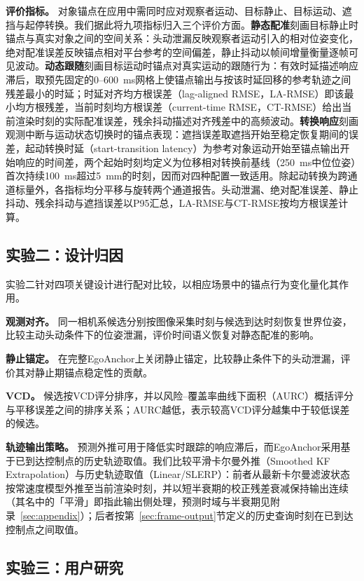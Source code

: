 \documentclass[review]{vgtc}
\begin{document}
\textbf{评价指标。}
对象锚点在应用中需同时应对观察者运动、目标静止、目标运动、遮挡与起停转换。我们据此将九项指标归入三个评价方面。\textbf{静态配准}刻画目标静止时锚点与真实对象之间的空间关系：头动泄漏反映观察者运动引入的相对位姿变化，绝对配准误差反映锚点相对平台参考的空间偏差，静止抖动以帧间增量衡量逐帧可见波动。\textbf{动态跟随}刻画目标运动时锚点对真实运动的跟随行为：有效时延描述响应滞后，取预先固定的0--600~ms网格上使锚点输出与按该时延回移的参考轨迹之间残差最小的时延；时延对齐均方根误差（lag-aligned RMSE，LA-RMSE）即该最小均方根残差，当前时刻均方根误差（current-time RMSE，CT-RMSE）给出当前渲染时刻的实际配准误差，残余抖动描述对齐残差中的高频波动。\textbf{转换响应}刻画观测中断与运动状态切换时的锚点表现：遮挡误差取遮挡开始至稳定恢复期间的误差，起动转换时延（start-transition latency）为参考对象运动开始至锚点输出开始响应的时间差，两个起始时刻均定义为位移相对转换前基线（250~ms中位位姿）首次持续100~ms超过5~mm的时刻，因而对四种配置一致适用。除起动转换为跨通道标量外，各指标均分平移与旋转两个通道报告。头动泄漏、绝对配准误差、静止抖动、残余抖动与遮挡误差以P95汇总，LA-RMSE与CT-RMSE按均方根误差计算。

\subsection{实验二：设计归因}\label{sec:exp2-design}

实验二针对四项关键设计进行配对比较，以相应场景中的锚点行为变化量化其作用。

\textbf{观测对齐。}
同一相机系候选分别按图像采集时刻与候选到达时刻恢复世界位姿，比较主动头动条件下的位姿泄漏，评价时间语义恢复对静态配准的影响。

\textbf{静止锚定。}
在完整EgoAnchor上关闭静止锚定，比较静止条件下的头动泄漏，评价其对静止期锚点稳定性的贡献。

\textbf{VCD。}
候选按VCD评分排序，并以风险--覆盖率曲线下面积（AURC）概括评分与平移误差之间的排序关系；AURC越低，表示较高VCD评分越集中于较低误差的候选。

\textbf{轨迹输出策略。}
预测外推可用于降低实时跟踪的响应滞后，而EgoAnchor采用基于已到达控制点的历史轨迹取值。我们比较平滑卡尔曼外推（Smoothed KF Extrapolation）与历史轨迹取值（Linear/SLERP）：前者从最新卡尔曼滤波状态按常速度模型外推至当前渲染时刻，并以短半衰期的校正残差衰减保持输出连续（其名中的「平滑」即指此输出侧处理，预测时域与半衰期见附录~\ref{sec:appendix}）；后者按第~\ref{sec:frame-output}节定义的历史查询时刻在已到达控制点之间取值。

\subsection{实验三：用户研究}\label{sec:exp3-design}
\end{document}
